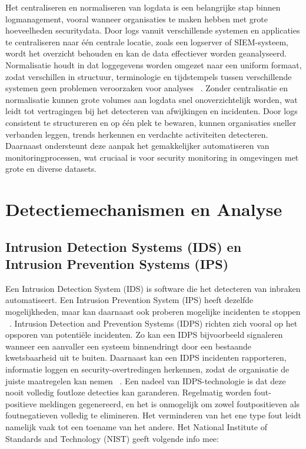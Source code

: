 Het centraliseren en normaliseren van logdata is een belangrijke stap binnen logmanagement, vooral wanneer organisaties te maken hebben met grote hoeveelheden securitydata. Door logs vanuit verschillende systemen en applicaties te centraliseren naar één centrale locatie, zoals een logserver of SIEM-systeem, wordt het overzicht behouden en kan de data effectiever worden geanalyseerd. Normalisatie houdt in dat loggegevens worden omgezet naar een uniform formaat, zodat verschillen in structuur, terminologie en tijdstempels tussen verschillende systemen geen problemen veroorzaken voor analyses ~\autocite{NIST_logs_2006}. Zonder centralisatie en normalisatie kunnen grote volumes aan logdata snel onoverzichtelijk worden, wat leidt tot vertragingen bij het detecteren van afwijkingen en incidenten. Door logs consistent te structureren en op één plek te bewaren, kunnen organisaties sneller verbanden leggen, trends herkennen en verdachte activiteiten detecteren. Daarnaast ondersteunt deze aanpak het gemakkelijker automatiseren van monitoringprocessen, wat cruciaal is voor security monitoring in omgevingen met grote en diverse datasets.



\section{Detectiemechanismen en Analyse}
\subsection{Intrusion Detection Systems (IDS) en Intrusion Prevention Systems (IPS)}
Een Intrusion Detection System (IDS) is software die het detecteren van inbraken automatiseert. Een Intrusion Prevention System (IPS) heeft dezelfde mogelijkheden, maar kan daarnaast ook proberen mogelijke incidenten te stoppen ~\autocite{Scarfone_Mell_2007}. Intrusion Detection and Prevention Systems (IDPS) richten zich vooral op het opsporen van potentiële incidenten. Zo kan een IDPS bijvoorbeeld signaleren wanneer een aanvaller een systeem binnendringt door een bestaande kwetsbaarheid uit te buiten. Daarnaast kan een IDPS incidenten rapporteren, informatie loggen en security-overtredingen herkennen, zodat de organisatie de juiste maatregelen kan nemen ~\autocite{Scarfone_Mell_2007}. Een nadeel van IDPS-technologie is dat deze nooit volledig foutloze detecties kan garanderen. Regelmatig worden fout-positieve meldingen gegenereerd, en het is onmogelijk om zowel foutpositieven als foutnegatieven volledig te elimineren. Het verminderen van het ene type fout leidt namelijk vaak tot een toename van het andere. Het National Institute of Standards and Technology (NIST) geeft volgende info mee:

